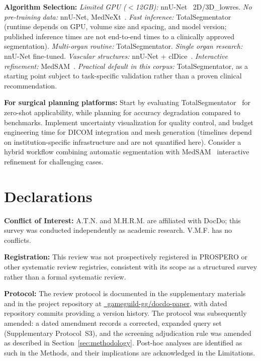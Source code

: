 \textbf{Algorithm Selection:} \emph{Limited GPU ($<$12GB):} nnU-Net~\cite{isensee2021nnunet} 2D/3D\_lowres. \emph{No pre-training data:} nnU-Net, MedNeXt~\cite{roy2023mednext}. \emph{Fast inference:} TotalSegmentator~\cite{wasserthal2023totalsegmentator} (runtime depends on GPU, volume size and spacing, and model version; published inference times are not end-to-end times to a clinically approved segmentation). \emph{Multi-organ routine:} TotalSegmentator. \emph{Single organ research:} nnU-Net fine-tuned. \emph{Vascular structures:} nnU-Net + clDice~\cite{shit2021cldice}. \emph{Interactive refinement:} MedSAM~\cite{ma2024medsam}. \emph{Practical default in this corpus:} TotalSegmentator, as a starting point subject to task-specific validation rather than a proven clinical recommendation.

\textbf{For surgical planning platforms:} Start by evaluating TotalSegmentator~\cite{wasserthal2023totalsegmentator} for zero-shot applicability, while planning for accuracy degradation compared to benchmarks. Implement uncertainty visualization for quality control, and budget engineering time for DICOM integration and mesh generation (timelines depend on institution-specific infrastructure and are not quantified here). Consider a hybrid workflow combining automatic segmentation with MedSAM~\cite{ma2024medsam} interactive refinement for challenging cases.

\section*{Declarations}

\textbf{Conflict of Interest:} A.T.N. and M.H.R.M. are affiliated with DocDo; this survey was conducted independently as academic research. V.M.F. has no conflicts.

\textbf{Registration:} This review was not prospectively registered in PROSPERO or other systematic review registries, consistent with its scope as a structured survey rather than a formal systematic review.

\textbf{Protocol:} The review protocol is documented in the supplementary materials and in the project repository at \href{https://github.com/gameguild-gg/docdo-paper}{\faGithub\ gameguild-gg/docdo-paper}, with dated repository commits providing a version history. The protocol was subsequently amended: a dated amendment records a corrected, expanded query set (Supplementary Protocol~S3), and the screening adjudication rule was amended as described in Section~\ref{sec:methodology}. Post-hoc analyses are identified as such in the Methods, and their implications are acknowledged in the Limitations.

